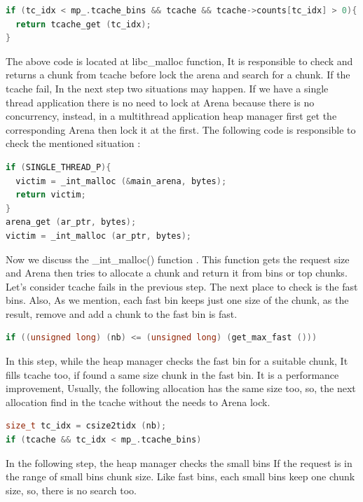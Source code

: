 \documentclass{masterthesis}
\newcommand*\tch{tcache}
\newcommand*\fb{fast bins}
\newcommand*\sbs{small bins}
\begin{document}
\begin{lstlisting}[language=c,frame=tlrb]
 if (tc_idx < mp_.tcache_bins && tcache && tcache->counts[tc_idx] > 0){
  return tcache_get (tc_idx);
}
\end{lstlisting}

The above code is located at libc\_malloc function, It is responsible to check and returns a chunk from \tch{} before lock the arena and search for a chunk. If the \tch{} fail, In the next step two situations may happen. If we have a single thread application there is no need to lock at Arena because there is no concurrency, instead, in a multi\-thread application heap manager first get the corresponding Arena then lock it at the first. The following code is responsible to check the mentioned situation :

\begin{lstlisting}[language=c,frame=tlrb]
if (SINGLE_THREAD_P){
  victim = _int_malloc (&main_arena, bytes);
  return victim;
}
arena_get (ar_ptr, bytes);
victim = _int_malloc (ar_ptr, bytes);
\end{lstlisting}

Now we discuss the \_int\_malloc() function . This function gets the request size and Arena then tries to allocate a chunk and return it from bins or top chunks. Let's consider \tch{} fails in the previous step. The next place to check is the \fb{}. Also, As we mention, each fast bin keeps just one size of the chunk, as the result, remove and add a chunk to the fast bin is fast.

\begin{lstlisting}[language=c,frame=tlrb]
if ((unsigned long) (nb) <= (unsigned long) (get_max_fast ()))
\end{lstlisting}

In this step, while the heap manager checks the fast bin for a suitable chunk, It fills \tch{} too, if found a same size chunk in the fast bin. It is a performance improvement, Usually, the following allocation has the same size too, so, the next allocation find in the \tch{} without the needs to Arena lock.

\begin{lstlisting}[language=c,frame=tlrb]
size_t tc_idx = csize2tidx (nb);
if (tcache && tc_idx < mp_.tcache_bins)
\end{lstlisting}

In the following step, the heap manager checks the \sbs{} If the request is in the range of \sbs{} chunk size. Like \fb{}, each \sbs{} keep one chunk size, so, there is no search too.
\end{document}
